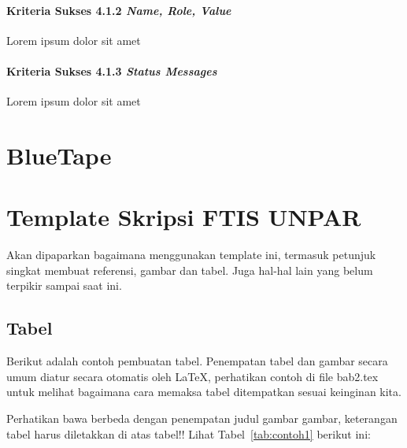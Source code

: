 \paragraph{Kriteria Sukses 4.1.2 \textit{Name, Role, Value}}
\label{sec:kriteria_sukses_4.1.2}
Lorem ipsum dolor sit amet

\paragraph{Kriteria Sukses 4.1.3 \textit{Status Messages}}
\label{sec:kriteria_sukses_4.1.3}
Lorem ipsum dolor sit amet



\section{BlueTape}
\label{sec:bluetape}


\section{Template Skripsi FTIS UNPAR}
\label{sec:template}
 
Akan dipaparkan bagaimana menggunakan template ini, termasuk petunjuk singkat membuat referensi, gambar dan tabel.
Juga hal-hal lain yang belum terpikir sampai saat ini. 
 

\subsection{Tabel}  
Berikut adalah contoh pembuatan tabel. 
Penempatan tabel dan gambar secara umum diatur secara otomatis oleh \LaTeX{}, perhatikan contoh di file bab2.tex untuk melihat bagaimana cara memaksa tabel ditempatkan sesuai keinginan kita.

Perhatikan bawa berbeda dengan penempatan judul gambar gambar, keterangan tabel harus diletakkan di atas tabel!!
Lihat Tabel~\ref{tab:contoh1} berikut ini:

